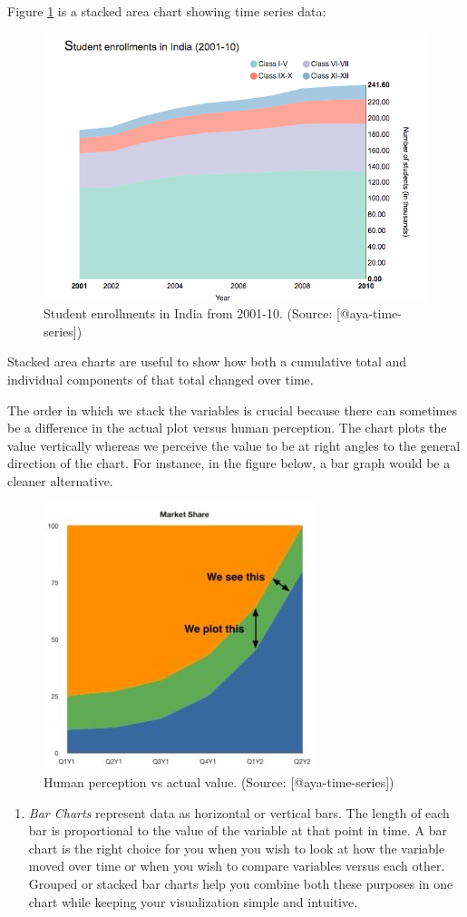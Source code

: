 \documentclass[]{book}
\providecommand{\tightlist}{%
  \setlength{\itemsep}{0pt}\setlength{\parskip}{0pt}}
\theoremstyle{definition}
\theoremstyle{definition}
\theoremstyle{definition}
\theoremstyle{remark}
\begin{document}
Figure \ref{fig:aya-stacked} is a stacked area chart showing time series
data:

\begin{figure}

{\centering \includegraphics[width=0.6\linewidth]{images/aya-stacked} 

}

\caption{Student enrollments in India from 2001-10. (Source: [@aya-time-series])}\label{fig:aya-stacked}
\end{figure}

Stacked area charts are useful to show how both a cumulative total and
individual components of that total changed over time.

The order in which we stack the variables is crucial because there can
sometimes be a difference in the actual plot versus human perception.
The chart plots the value vertically whereas we perceive the value to be
at right angles to the general direction of the chart. For instance, in
the figure below, a bar graph would be a cleaner alternative.

\begin{figure}

{\centering \includegraphics[width=0.3\linewidth]{images/aya-stacked-perception} 

}

\caption{Human perception vs actual value. (Source: [@aya-time-series])}\label{fig:aya-stacked-perception}
\end{figure}

\begin{enumerate}
\def\labelenumi{\arabic{enumi}.}
\setcounter{enumi}{2}
\tightlist
\item
  \emph{Bar Charts} represent data as horizontal or vertical bars. The
  length of each bar is proportional to the value of the variable at
  that point in time. A bar chart is the right choice for you when you
  wish to look at how the variable moved over time or when you wish to
  compare variables versus each other. Grouped or stacked bar charts
  help you combine both these purposes in one chart while keeping your
  visualization simple and intuitive.
\end{enumerate}
\end{document}
